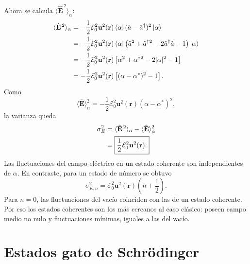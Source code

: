 \documentclass[11pt]{article}
\newcommand{\vb}[1]{\mathbf{#1}}
\newcommand{\adag}{\hat a^\dagger}
\newcommand{\Ezero}{\mathcal E_0}
\begin{document}
Ahora se calcula $\langle\hat{\vb E}^{\,2}\rangle_\alpha$:
\begin{align}
  \langle\hat{\vb E}^{\,2}\rangle_\alpha
  &=
  -\frac12\Ezero^2\vb u^2(\vb r)
  \bra\alpha(\hat a-\adag)^2\ket\alpha \notag\\
  &=
  -\frac12\Ezero^2\vb u^2(\vb r)
  \bra\alpha
  \left(
  \hat a^2+\adag{}^2-2\adag\hat a-1
  \right)
  \ket\alpha \notag\\
  &=
  -\frac12\Ezero^2\vb u^2(\vb r)
  \left[
  \alpha^2+\alpha^{*2}-2|\alpha|^2-1
  \right] \notag\\
  &=
  -\frac12\Ezero^2\vb u^2(\vb r)
  \left[
  (\alpha-\alpha^*)^2-1
  \right].
\end{align}
Como
\begin{equation}
  \langle\hat{\vb E}\rangle_\alpha^2
  =
  -\frac12\Ezero^2\vb u^2(\vb r)(\alpha-\alpha^*)^2,
\end{equation}
la varianza queda
\begin{align}
  \sigma_E^2
  &=
  \langle\hat{\vb E}^{\,2}\rangle_\alpha
  -
  \langle\hat{\vb E}\rangle_\alpha^2 \notag\\
  &=
  \boxed{
  \frac12\Ezero^2\vb u^2(\vb r).
  }
\end{align}
Las fluctuaciones del campo el\'ectrico en un estado coherente son
independientes de $\alpha$. En contraste, para un estado de n\'umero se obtuvo
\begin{equation}
  \sigma_{E,n}^2
  =
  \Ezero^2\vb u^2(\vb r)\left(n+\frac12\right).
\end{equation}
Para $n=0$, las fluctuaciones del vac\'io coinciden con las de un estado
coherente. Por eso los estados coherentes son los m\'as cercanos al caso
cl\'asico: poseen campo medio no nulo y fluctuaciones m\'inimas, iguales a las
del vac\'io.

\section{Estados gato de Schr\"odinger}
\end{document}
